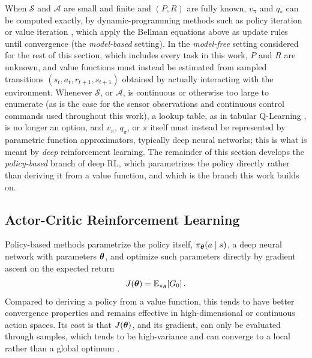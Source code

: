 When $\mathcal{S}$ and $\mathcal{A}$ are small and finite and $(P,R)$ are fully known, $v_\pi$ and $q_*$ can be computed exactly, by dynamic-programming methods such as policy iteration or value iteration \cite{bellman1957dynamic, howard1960dynamic}, which apply the Bellman equations above as update rules until convergence (the \emph{model-based} setting). In the \emph{model-free} setting considered for the rest of this section, which includes every task in this work, $P$ and $R$ are unknown, and value functions must instead be estimated from sampled transitions $(s_t, a_t, r_{t+1}, s_{t+1})$ obtained by actually interacting with the environment. Whenever $\mathcal{S}$, or $\mathcal{A}$, is continuous or otherwise too large to enumerate (as is the case for the sensor observations and continuous control commands used throughout this work), a lookup table, as in tabular Q-Learning \cite{watkins1992qlearning}, is no longer an option, and $v_\pi$, $q_\pi$, or $\pi$ itself must instead be represented by parametric function approximators, typically deep neural networks; this is what is meant by \emph{deep} reinforcement learning. The remainder of this section develops the \emph{policy-based} branch of deep RL, which parametrizes the policy directly rather than deriving it from a value function, and which is the branch this work builds on.

\subsection{Actor-Critic Reinforcement Learning}
\label{subsec:actor-critic}

Policy-based methods \cite{williams1992simple, sutton1999policygradient} parametrize the policy itself, $\pi_{\bm{\theta}}(a\mid s)$, a deep neural network with parameters $\bm{\theta}$, and optimize such parameters directly by gradient ascent on the expected return
\begin{equation}
J(\bm{\theta}) = \mathbb{E}_{\pi_{\bm{\theta}}}\!\left[G_0\right].
\end{equation}
Compared to deriving a policy from a value function, this tends to have better convergence properties and remains effective in high-dimensional or continuous action spaces. Its cost is that $J(\bm{\theta})$, and its gradient, can only be evaluated through samples, which tends to be high-variance and can converge to a local rather than a global optimum \cite{suttonbarto2018}.


